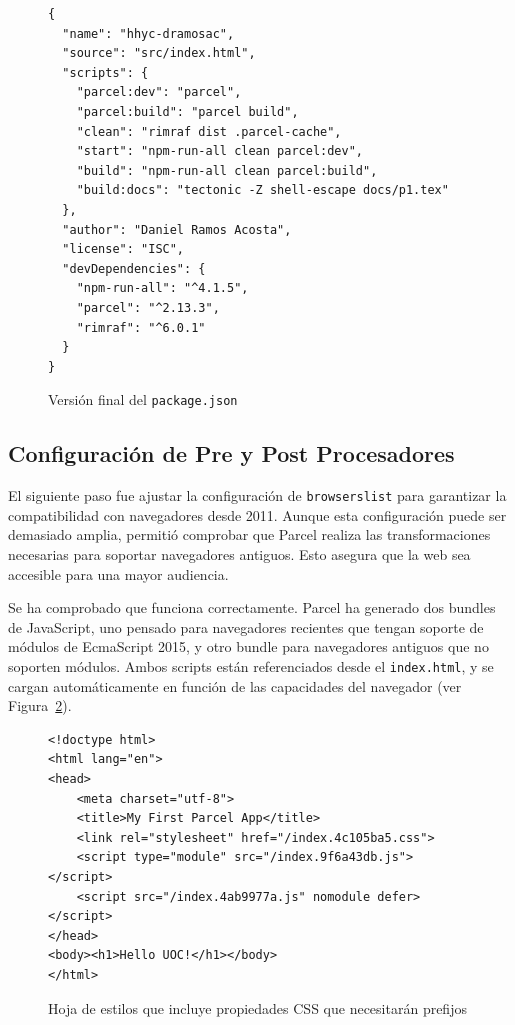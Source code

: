 \documentclass{article}
\begin{document}
\begin{figure}[h!]
\begin{verbatim}
{
  "name": "hhyc-dramosac",
  "source": "src/index.html",
  "scripts": {
    "parcel:dev": "parcel",
    "parcel:build": "parcel build",
    "clean": "rimraf dist .parcel-cache",
    "start": "npm-run-all clean parcel:dev",
    "build": "npm-run-all clean parcel:build",
    "build:docs": "tectonic -Z shell-escape docs/p1.tex"
  },
  "author": "Daniel Ramos Acosta",
  "license": "ISC",
  "devDependencies": {
    "npm-run-all": "^4.1.5",
    "parcel": "^2.13.3",
    "rimraf": "^6.0.1"
  }
}
\end{verbatim}
\caption{Versión final del \lstinline{package.json}}
\label{fig:package-json}
\end{figure}

\subsection{Configuración de Pre y Post Procesadores}\label{subsec:configuracion-de-pre-y-post-procesadores}

El siguiente paso fue ajustar la configuración de \texttt{browserslist} para garantizar la compatibilidad con navegadores desde 2011. Aunque esta configuración puede ser demasiado amplia, permitió comprobar que Parcel realiza las transformaciones necesarias para soportar navegadores antiguos. Esto asegura que la web sea accesible para una mayor audiencia.

Se ha comprobado que funciona correctamente. Parcel ha generado dos bundles de JavaScript, uno pensado para navegadores recientes que tengan soporte de módulos de EcmaScript 2015, y otro bundle para navegadores antiguos que no soporten módulos. Ambos scripts están referenciados desde el \texttt{index.html}, y se cargan automáticamente en función de las capacidades del navegador (ver Figura~\ref{fig:index-html}).

\begin{figure}[h!]
\begin{verbatim}
<!doctype html>
<html lang="en">
<head>
    <meta charset="utf-8">
    <title>My First Parcel App</title>
    <link rel="stylesheet" href="/index.4c105ba5.css">
    <script type="module" src="/index.9f6a43db.js"></script>
    <script src="/index.4ab9977a.js" nomodule defer></script>
</head>
<body><h1>Hello UOC!</h1></body>
</html>
\end{verbatim}
\caption{Hoja de estilos que incluye propiedades CSS que necesitarán prefijos}
\label{fig:index-html}
\end{figure}
\end{document}

